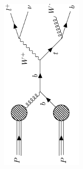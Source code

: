 \begin{figure}
{\begin{subfigure}{.5\textwidth}
            \caption{}
            \label{fig:topOthers}
        \end{subfigure}
        \hspace{1.5cm}
        \begin{subfigure}{.5\textwidth}
            \includegraphics[width=0.45\textwidth, angle = -90]{Figures/FDiagrams/singleTop.png}
            \caption{}
            \label{fig:singleTop}
        \end{subfigure}
    }
    \\
    \newline
\end{figure}
